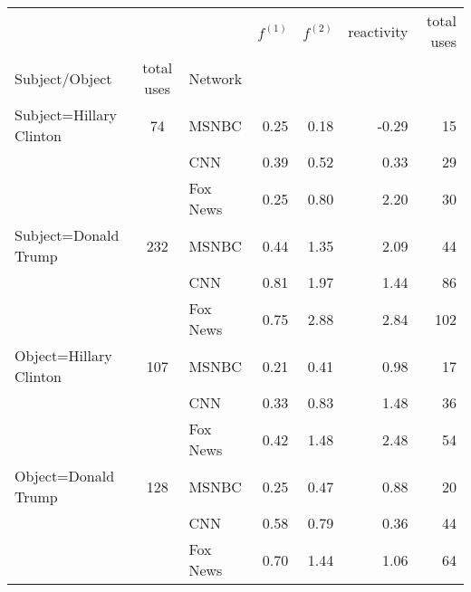 \begin{tabular}{lclrrrr}
\toprule
                 &   &     & $f^{(1)}$ & $f^{(2)}$ & reactivity & total uses \\
  Subject/Object & total uses &Network &           &           &            &            \\
\midrule
Subject=Hillary Clinton & 74 & MSNBC &      0.25 &      0.18 &      -0.29 &         15 \\
                  & & CNN &      0.39 &      0.52 &       0.33 &         29 \\
                  & & Fox News &      0.25 &      0.80 &       2.20 &         30 \\
\hline
Subject=Donald Trump & 232 & MSNBC &      0.44 &      1.35 &       2.09 &         44 \\
                  & & CNN &      0.81 &      1.97 &       1.44 &         86 \\
                  & & Fox News &      0.75 &      2.88 &       2.84 &        102 \\
\hline
Object=Hillary Clinton & 107 & MSNBC &      0.21 &      0.41 &       0.98 &         17 \\
                  & & CNN &      0.33 &      0.83 &       1.48 &         36 \\
                  & & Fox News &      0.42 &      1.48 &       2.48 &         54 \\
\hline
Object=Donald Trump & 128 & MSNBC &      0.25 &      0.47 &       0.88 &         20 \\
                  & & CNN &      0.58 &      0.79 &       0.36 &         44 \\
                  & & Fox News &      0.70 &      1.44 &       1.06 &         64 \\
\bottomrule
\end{tabular}
